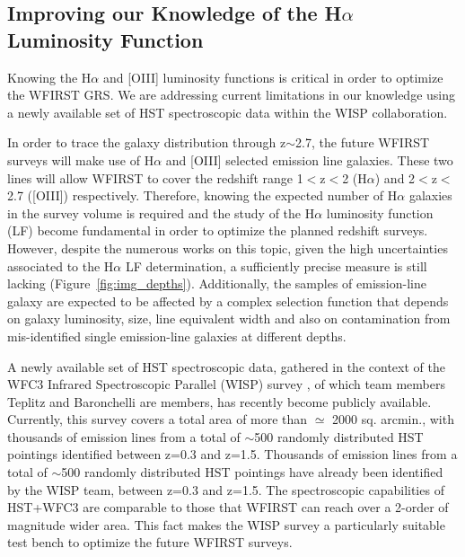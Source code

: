 \subsection{Improving our Knowledge of the H$\alpha$ Luminosity Function}
\label{sec:LF}
\begin{summaryii}
Knowing the H$\alpha$ and [OIII] luminosity functions is critical in order to optimize the WFIRST GRS. We are addressing current limitations in our knowledge using a newly available set of HST spectroscopic data within the WISP collaboration.
\end{summaryii}

In order to trace the galaxy distribution through z$\sim$2.7, the future WFIRST
surveys will make use of H$\alpha$ and [OIII] selected emission line galaxies.
These two lines will allow WFIRST to cover the redshift range 1$<$z$<$2
(H$\alpha$) and 2$<$z$<$2.7 ([OIII]) respectively. Therefore, knowing the
expected number of H$\alpha$ galaxies in the survey volume is required and the
study of the H$\alpha$ luminosity function (LF) become fundamental in order to
optimize the planned redshift surveys. However, despite the numerous works on
this topic, given the high uncertainties associated to the H$\alpha$ LF
determination, a sufficiently precise measure is still lacking
(Figure~\ref{fig:img_depths}). Additionally, the samples of emission-line
galaxy are expected to be affected by a complex selection function that depends
on galaxy luminosity, size, line equivalent width and also on contamination from
mis-identified single emission-line galaxies at different depths.

A newly available set of HST spectroscopic data, gathered in the context of the
WFC3 Infrared Spectroscopic Parallel (WISP) survey \citep{Atek:2010},
of which team members Teplitz and Baronchelli are members, has recently become
publicly available. Currently, this survey covers a total area of more than
$\simeq$ 2000 sq. arcmin., with thousands of emission lines from a total
of $\sim$500 randomly distributed HST pointings identified between z=0.3 and
z=1.5. Thousands of emission lines from a total of $\sim$500 randomly
distributed HST pointings have already been identified by the WISP team, between z=0.3 and z=1.5. The spectroscopic capabilities of HST+WFC3 are comparable to those that WFIRST can reach over a 2-order of magnitude wider area. This fact makes the WISP survey a particularly suitable test bench to optimize the future WFIRST surveys.

